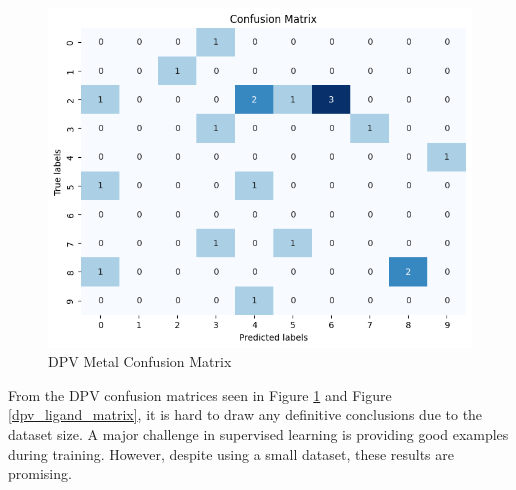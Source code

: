 \begin{figure}[h!]
  \centering
    \includegraphics[width=1.0\textwidth]{figures/dpv_metal_matrix.png}
    \caption{DPV Metal Confusion Matrix}
    \label{dpv_metal_matrix}
\end{figure}
From the DPV confusion matrices seen in Figure \ref{dpv_metal_matrix} and Figure \ref{dpv_ligand_matrix}, it is hard to draw any definitive conclusions due to the dataset size. 
A major challenge in supervised learning is providing good examples during training. However, despite using a small dataset, these results are promising. 
